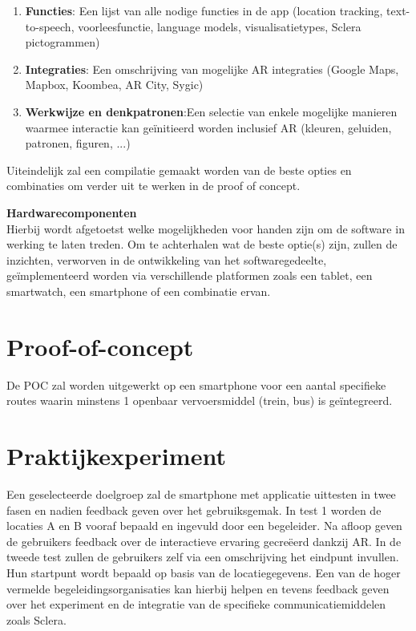 \documentclass{hogent-article}
\begin{document}
    \begin{enumerate}
        \item \textbf{Functies}: Een lijst van alle nodige functies in de app (location tracking, text-to-speech, voorleesfunctie, language models, visualisatietypes, Sclera pictogrammen)
        \item \textbf{Integraties}: Een omschrijving van mogelijke AR integraties (Google Maps, Mapbox, Koombea, AR City, Sygic)
        \item \textbf{Werkwijze en denkpatronen}:Een selectie van enkele mogelijke manieren waarmee interactie kan geïnitieerd worden inclusief AR (kleuren, geluiden, patronen, figuren, ...)
    \end{enumerate}

    Uiteindelijk zal een compilatie gemaakt worden van de beste opties en combinaties om verder uit te werken in de proof of concept.
    
    \textbf{Hardwarecomponenten} \\
    
    Hierbij wordt afgetoetst welke mogelijkheden voor handen zijn om de software in werking te laten treden. Om te achterhalen wat de beste optie(s) zijn, zullen de inzichten, verworven in de ontwikkeling van het softwaregedeelte, geïmplementeerd worden via verschillende platformen zoals een tablet, een smartwatch, een smartphone of een combinatie ervan.
    
    \section{Proof-of-concept}%
    \label{sec:proof-of-concept}
    De POC zal worden uitgewerkt op een smartphone voor een aantal specifieke routes waarin minstens 1 openbaar vervoersmiddel (trein, bus) is geïntegreerd.
    
    \section{Praktijkexperiment}
    \label{sec:praktijkexperiment}
    Een geselecteerde doelgroep zal de smartphone met applicatie uittesten in twee fasen en nadien feedback geven over het gebruiksgemak. In test 1 worden de locaties A en B vooraf bepaald en ingevuld door een begeleider. Na afloop geven de gebruikers feedback over de interactieve ervaring gecreëerd dankzij AR. In de tweede test zullen de gebruikers zelf via een omschrijving het eindpunt invullen. Hun startpunt wordt bepaald op basis van de locatiegegevens. Een van de hoger vermelde begeleidingsorganisaties kan hierbij helpen en tevens feedback geven over het experiment en de integratie van de specifieke communicatiemiddelen zoals Sclera.
\end{document}
